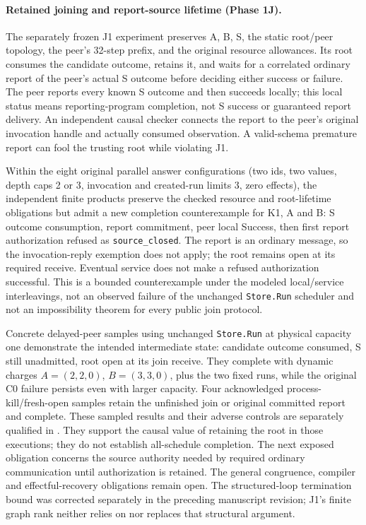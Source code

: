 \documentclass[11pt,a4paper]{article}
\theoremstyle{definition}
\theoremstyle{remark}
\begin{document}
\paragraph{Retained joining and report-source lifetime (Phase 1J).} The separately frozen J1 experiment preserves A, B, S, the static root/peer topology, the peer's 32-step prefix, and the original resource allowances. Its root consumes the candidate outcome, retains it, and waits for a correlated ordinary report of the peer's actual S outcome before deciding either success or failure. The peer reports every known S outcome and then succeeds locally; this local status means reporting-program completion, not S success or guaranteed report delivery. An independent causal checker connects the report to the peer's original invocation handle and actually consumed observation. A valid-schema premature report can fool the trusting root while violating J1.

Within the eight original parallel answer configurations (two ids, two values, depth caps 2 or 3, invocation and created-run limits 3, zero effects), the independent finite products preserve the checked resource and root-lifetime obligations but admit a new completion counterexample for K1, A and B: S outcome consumption, report commitment, peer local Success, then first report authorization refused as \texttt{source\_closed}. The report is an ordinary message, so the invocation-reply exemption does not apply; the root remains open at its required receive. Eventual service does not make a refused authorization successful. This is a bounded counterexample under the modeled local/service interleavings, not an observed failure of the unchanged \texttt{Store.Run} scheduler and not an impossibility theorem for every public join protocol.

Concrete delayed-peer samples using unchanged \texttt{Store.Run} at physical capacity one demonstrate the intended intermediate state: candidate outcome consumed, S still unadmitted, root open at its join receive. They complete with dynamic charges $A=(2,2,0)$, $B=(3,3,0)$, plus the two fixed runs, while the original C0 failure persists even with larger capacity. Four acknowledged process-kill/fresh-open samples retain the unfinished join or original committed report and complete. These sampled results and their adverse controls are separately qualified in . They support the causal value of retaining the root in those executions; they do not establish all-schedule completion. The next exposed obligation concerns the source authority needed by required ordinary communication until authorization is retained. The general congruence, compiler and effectful-recovery obligations remain open. The structured-loop termination bound was corrected separately in the preceding manuscript revision; J1's finite graph rank neither relies on nor replaces that structural argument.
\end{document}
